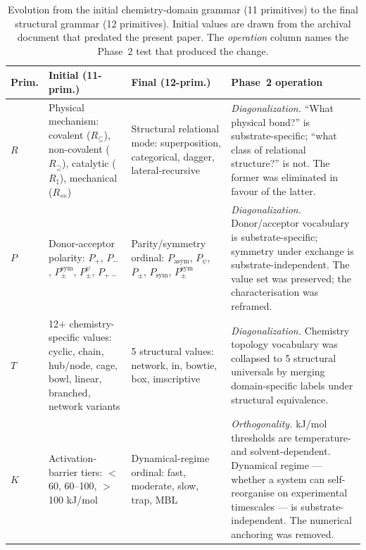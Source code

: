 \documentclass[12pt,a4paper]{article}
\renewcommand{\arraystretch}{1.3}
\begin{document}
\begin{table}[htbp]
\centering
\caption{Evolution from the initial chemistry-domain grammar (11 primitives)
  to the final structural grammar (12 primitives). Initial values are drawn
  from the archival document that predated the present paper. The
  \emph{operation} column names the Phase~2 test that produced the change.}
\label{tab:grammar-evolution}
\small
\renewcommand{\arraystretch}{1.35}
\begin{tabular}{@{}p{}p{}p{}p{}@{}}
\toprule
\textbf{Prim.} & \textbf{Initial (11-prim.)} & \textbf{Final (12-prim.)} & \textbf{Phase~2 operation} \\
\midrule
$R$ &
  Physical mechanism: covalent ($R_{\subseteq}$), non-covalent ($R_{\supseteq}$),
  catalytic ($R_{\ddagger}$), mechanical ($R_{\Leftrightarrow}$) &
  Structural relational mode: superposition, categorical, dagger,
  lateral-recursive &
  \emph{Diagonalization.} ``What physical bond?'' is substrate-specific;
  ``what class of relational structure?'' is not.
  The former was eliminated in favour of the latter. \\

$P$ &
  Donor-acceptor polarity: $P_{+}$, $P_{-}$, $P_{\pm}^{\text{sym}}$,
  $P_{\pm}^{\psi}$, $P_{+-}$ &
  Parity/symmetry ordinal: $P_{\text{asym}}$, $P_{\psi}$, $P_{\pm}$,
  $P_{\text{sym}}$, $P_{\pm}^{\text{sym}}$ &
  \emph{Diagonalization.} Donor/acceptor vocabulary is substrate-specific;
  symmetry under exchange is substrate-independent.
  The value set was preserved; the characterisation was reframed. \\

$T$ &
  12$+$ chemistry-specific values: cyclic, chain, hub/node, cage, bowl,
  linear, branched, network variants &
  5 structural values: network, in, bowtie, box, imscriptive &
  \emph{Diagonalization.} Chemistry topology vocabulary was collapsed
  to 5 structural universals by merging domain-specific labels under
  structural equivalence. \\

$K$ &
  Activation-barrier tiers: $<$60, 60--100, $>$100 kJ/mol &
  Dynamical-regime ordinal: fast, moderate, slow, trap, MBL &
  \emph{Orthogonality.} kJ/mol thresholds are temperature- and
  solvent-dependent. Dynamical regime --- whether a system can
  self-reorganise on experimental timescales --- is substrate-independent.
  The numerical anchoring was removed. \\


\end{tabular}
\end{table}
\end{document}
